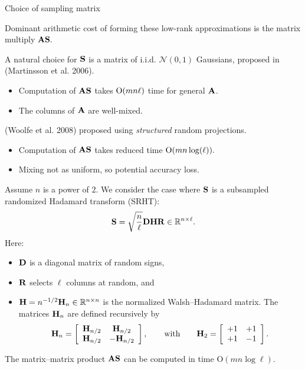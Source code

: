 \documentclass[xcolor=x11names,compress,ignorenonframetext]{beamer}
\renewcommand{\(}{\begin{columns}}
\renewcommand{\)}{\end{columns}}
\newcommand{\<}[1]{\begin{column}{#1}}
\renewcommand{\>}{\end{column}}
\def\refcolor{DodgerBlue4}
\newcommand{\refer}[1]{({\color{\refcolor}#1})}
\begin{document}
\begin{frame}{Choice of sampling matrix}

Dominant arithmetic cost of forming these low-rank approximations is the matrix multiply $\mathbf{A}\mathbf{S}.$
\vspace{1em}

A natural choice for $\mathbf{S}$ is a matrix of i.i.d. $\mathcal{N}(0,1)$ Gaussians, proposed in \refer{Martinsson et al. 2006}. 
\begin{itemize}
 \item Computation of 
$\mathbf{A} \mathbf{S}$ takes $\mathrm{O}(mn\ell)$ time for general $\mathbf{A}$.
 \item The columns of $\mathbf{A}$ are well-mixed.
\end{itemize}

\vspace{1em}

\refer{Woolfe et al. 2008} proposed using \emph{structured} random projections.

\begin{itemize}
 \item Computation of $\mathbf{A} \mathbf{S}$ takes reduced time $\mathrm{O}(mn \log(\ell)).$
 \item Mixing not as uniform, so potential accuracy loss.
\end{itemize}

\end{frame}

\begin{frame}
 Assume $n$ is a power of $2.$ We consider the case where $\mathbf{S}$ is a subsampled randomized Hadamard transform (SRHT):
 \[
  \mathbf{S} = \sqrt{\frac{n}{\ell}} \mathbf{D} \mathbf{H} \mathbf{R} \in \mathbb{R}^{n \times \ell}.
 \]
Here:
\begin{itemize}
 \item  $\mathbf{D}$ is a diagonal matrix of random signs,
 \item  $\mathbf{R}$ selects $\ell$ columns at random, and 
 \item $\mathbf{H} = n^{-1/2} \mathbf{H}_n \in \mathbb{R}^{n \times n}$ is the normalized Walsh--Hadamard matrix. The matrices $\mathbf{H}_n$ are
defined recursively by
\[
 \matH_n = \left[
\begin{array}{cc}
  \matH_{n/2} &  \matH_{n/2} \\
  \matH_{n/2} & -\matH_{n/2}
\end{array}\right],
%
\qquad \mbox{with} \qquad
%
\matH_2 = \left[
\begin{array}{cc}
  +1 & +1 \\
  +1 & -1
\end{array}\right].
\]
\end{itemize}

The matrix--matrix product $\mathbf{A} \mathbf{S}$ can be computed in time $\mathrm{O}(mn\log\ell).$
\end{frame}
\end{document}
